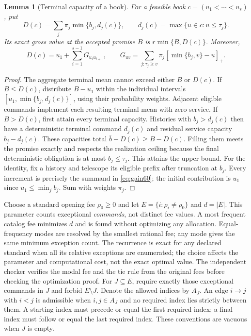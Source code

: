\documentclass[11pt,letterpaper]{article}
\newtheorem{lemma}[theorem]{Lemma}
\theoremstyle{definition}\newtheorem{remark}[theorem]{Remark}
\begin{document}
\begin{lemma}[Terminal capacity of a book]\label{lem:capacity60}
For a feasible book $c=(u_1<\cdots<u_s)$, put
\[
 D(c)=\sum_j\pi_j\min\{b_j,d_j(c)\},\qquad
 d_j(c)=\max\{u\in c:u\leq\tau_j\}.
\]
Its exact gross value at the accepted promise $B$ is $r\min\{B,D(c)\}$. Moreover,
\begin{equation}\label{eq:gain60}
 D(c)=u_1+\sum_{i=1}^{s-1}G_{u_i u_{i+1}},\qquad
 G_{uv}=\sum_{j:\tau_j\geq v}\pi_j[\min\{b_j,v\}-u]_+.
\end{equation}
\end{lemma}
\begin{proof}
The aggregate terminal mean cannot exceed either $B$ or $D(c)$. If $B\leq D(c)$, distribute $B-u_1$ within the individual intervals $[u_1,\min\{b_j,d_j(c)\}]$, using their probability weights. Adjacent eligible commands implement each resulting terminal mean with zero service. If $B>D(c)$, first attain every terminal capacity. Histories with $b_j>d_j(c)$ then have a deterministic terminal command $d_j(c)$ and residual service capacity $b_j-d_j(c)$. These capacities total $\bar b-D(c)\geq B-D(c)$. Filling them meets the promise exactly and respects the realization ceiling because the final deterministic obligation is at most $b_j\leq\tau_j$. This attains the upper bound. For the identity, fix a history and telescope its eligible prefix after truncation at $b_j$. Every increment is precisely the summand in \eqref{eq:gain60}; the initial contribution is $u_1$ since $u_1\leq\min_j b_j$. Sum with weights $\pi_j$.
\end{proof}

Choose a standard opening fee $\rho_0\geq0$ and let $E=\{i:\rho_i\ne\rho_0\}$ and $d=|E|$. This parameter counts exceptional \emph{commands}, not distinct fee values. A most frequent catalog fee minimizes $d$ and is found without optimizing any allocation. Equal-frequency modes are resolved by the smallest rational fee; any mode gives the same minimum exception count. The recurrence is exact for any declared standard when all its relative exceptions are enumerated; the choice affects the parameter and computational cost, not the exact optimal value. The independent checker verifies the modal fee and the tie rule from the original fees before checking the optimization proof. For $J\subseteq E$, require exactly those exceptional commands in $J$ and forbid $E\setminus J$. Denote the allowed indices by $A_J$. An edge $i\to j$ with $i<j$ is admissible when $i,j\in A_J$ and no required index lies strictly between them. A starting index must precede or equal the first required index; a final index must follow or equal the last required index. These conventions are vacuous when $J$ is empty.
\end{document}
